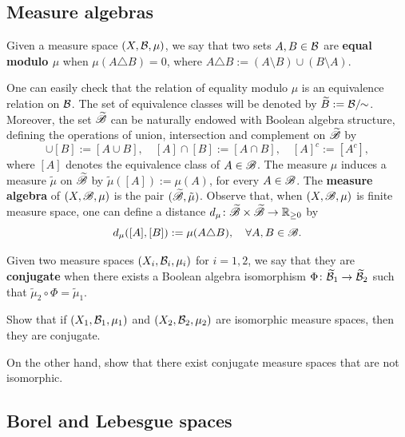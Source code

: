 \subsection{Measure algebras}
\label{sec:measure-algebras}

Given a measure space $(X,\mathcal{B},\mu)$, we say that two sets $A,B\in\mathcal{B}$ are \textbf{equal modulo $\mu$} when $\mu(A\triangle B)=0$, where $A\triangle B:=(A\setminus B)\cup (B\setminus A)$.

One can easily check that the relation of equality modulo $\mu$ is an equivalence relation on $\mathcal{B}$. The set of equivalence classes will be denoted by $\widetilde{B}:=\mathcal{B}/\!\!\sim$. Moreover, the set $\widetilde{\mathscr{B}}$ can be naturally endowed with Boolean algebra structure, defining the operations of union, intersection and complement on $\widetilde{\mathscr{B}}$ by
\begin{displaymath}
  [A]\cup[B]:=[A\cup B],\quad [A]\cap[B]:=[A\cap B],\quad [A]^c:=[A^c],
\end{displaymath}
where $[A]$ denotes the equivalence class of $A\in\mathscr{B}$. The measure $\mu$ induces a measure $\tilde\mu$ on $\widetilde{\mathscr{B}}$ by $\tilde\mu([A]):=\mu(A)$, for every $A\in\mathscr{B}$. The \textbf{measure algebra} of $(X,\mathscr{B},\mu)$ is the pair $(\widetilde{\mathscr{B}},\tilde\mu)$. Observe that, when $(X,\mathscr{B},\mu)$ is finite measure space, one can define a distance $d_{\mu}\colon \widetilde{\mathscr{B}}\times\widetilde{\mathscr{B}}\to\mathbb{R}_{\geq 0}$ by
\begin{displaymath}
  d_\mu([A],[B]):=\mu(A\triangle B), \quad\forall A,B\in\mathscr{B}.
\end{displaymath}

Given two measure spaces $(X_i,\mathcal{B}_i,\mu_i)$ for $i=1,2$, we say that they are \textbf{conjugate} when there exists a Boolean algebra isomorphism $\Phi\colon \widetilde{\mathcal{B}}_1\to \widetilde{\mathcal{B}}_2$ such that $\tilde\mu_2\circ\Phi=\tilde\mu_1$.

\begin{exercise}
  Show that if $(X_1,\mathcal{B}_1,\mu_1)$ and $(X_2,\mathcal{B}_2,\mu_2)$ are isomorphic measure spaces, then they are conjugate.

  On the other hand, show that there exist conjugate measure spaces that are not isomorphic.
\end{exercise}


\subsection{Borel and Lebesgue spaces}\label{sec:Borel-Lebesgue-spaces}

